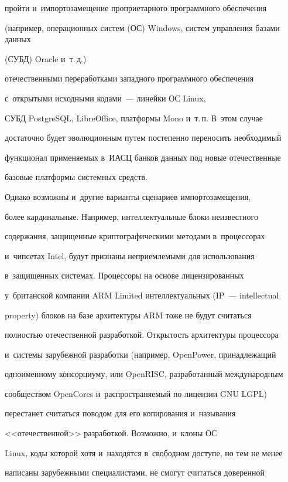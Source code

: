 \mbox{пройти} и~импортозамещение проприетарного программного обеспечения 


(например, операционных систем (ОС) Windows, систем управления базами данных


(СУБД) Oracle и~т.\,д.)\ 


отечественными переработками западного программного обеспечения 


с~открытыми исходными кодами~--- линейки ОС Linux, 


СУБД PostgreSQL, LibreOffice, платформы Mono и~т.\,п. В~этом случае 


достаточно будет эволюционным путем постепенно переносить необходимый 


функционал применяемых в~ИАСЦ банков данных под новые отечественные 


базовые платформы системных средств.


     


     Однако возможны и~другие варианты сценариев импортозамещения, 


более кардинальные. Например, интеллектуальные блоки неизвестного 


содержания, защищенные криптографическими методами в~процессорах 


и~чипсетах Intel, будут признаны неприемлемыми для использования 


в~защищенных системах. Процессоры на основе лицензированных 


у~британской компании ARM Limited интеллектуальных (IP~--- intellectual 


property) блоков на базе архитектуры ARM тоже не будут считаться 


полностью отечественной разработкой. Открытость архитектуры процессора 


и~системы зарубежной разработки (например, OpenPower, принадлежащий 


одноименному консорциуму, или OpenRISC, разработанный международным 


сообществом OpenCores и~распространяемый по лицензии GNU LGPL) 


перестанет считаться поводом для его копирования и~называния 


<<отечественной>> разработкой. Возможно, и~клоны ОС 


Linux, коды которой хотя и~находятся в~свободном доступе, но тем не менее 


написаны зарубежными специалистами, не смогут считаться доверенной 


